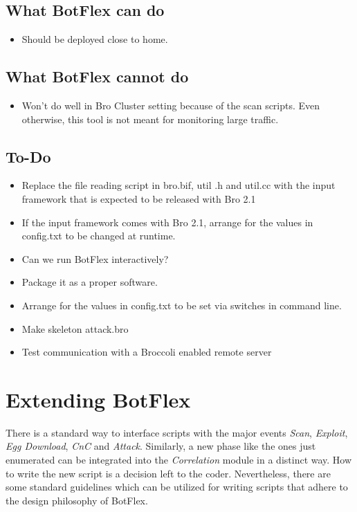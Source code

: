 \documentclass[acmtocl]{acmtrans2m}
\begin{document}
\subsection{What BotFlex can do}
\begin{itemize}
\item Should be deployed close to home.
\end{itemize}

\subsection{What BotFlex cannot do}
\begin{itemize}
\item Won't do well in Bro Cluster setting because of the scan scripts.
Even otherwise, this tool is not meant for monitoring large traffic.
\end{itemize}

\subsection{To-Do}
\begin{itemize}
\item Replace the file reading script in bro.bif, util .h and util.cc
with the input framework that is expected to be released with Bro 2.1
\item If the input framework comes with Bro 2.1, arrange for the values
in config.txt to be changed at runtime.
\item Can we run BotFlex interactively?
\item Package it as a proper software.
\item Arrange for the values in config.txt to be set
via switches in command line.
\item Make skeleton attack.bro
\item Test communication with a Broccoli enabled remote server
\end{itemize}


\section{Extending BotFlex}
There is a standard way to interface scripts with the major events 
\textit{Scan}, \textit{Exploit}, \textit{Egg Download}, \textit{CnC} and \textit{Attack}. 
Similarly, a new phase like the ones just enumerated can be integrated
 into the \textit{Correlation} module in a distinct way. 
How to write the new script is a decision left to the coder. 
Nevertheless, there are some standard guidelines which can be utilized 
for writing scripts that adhere to the design philosophy of BotFlex.
\end{document}
